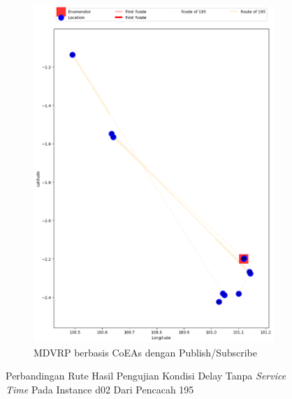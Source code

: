 \begin{figure}[H]\ContinuedFloat
	\centering
	\begin{subfigure}[t]{\textwidth}
		\centering
		\includegraphics[width=\textwidth]{Resources/Images/delayed_2/real_m15_n100_delayed_2_195_pubsub_coes}
		\caption{MDVRP berbasis CoEAs dengan Publish/Subscribe}
		\label{fig:real_m15_n100_delayed_2_195_pubsub_coes}
	\end{subfigure}
	\caption{Perbandingan Rute Hasil Pengujian Kondisi Delay Tanpa \textit{Service Time} Pada Instance d02 Dari Pencacah 195}
	\label{fig:real_m15_n100_delayed_2_195_contd}
\end{figure}


